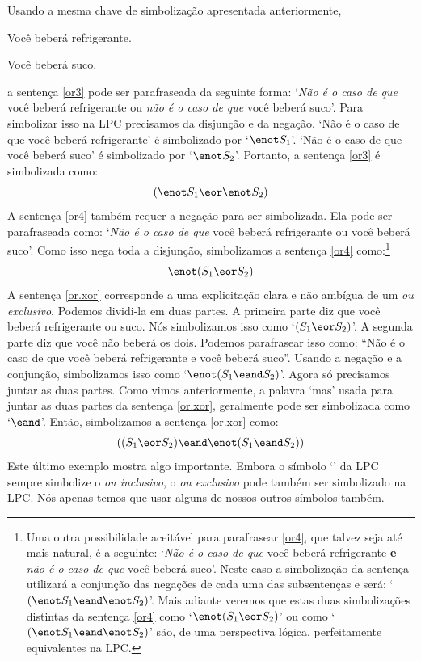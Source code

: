 Usando a mesma chave de simbolização apresentada anteriormente,
	\begin{ekey}
		\item[S_1] Você beberá refrigerante.
		\item[S_2] Você beberá suco.
	\end{ekey}
a sentença \ref{or3} pode ser parafraseada da seguinte forma:
`\emph{Não é o caso de que} você beberá refrigerante ou \emph{não é o caso de que} você beberá suco'.
Para simbolizar isso na LPC precisamos da disjunção e da negação.
`Não é o caso de que você beberá refrigerante' é simbolizado por `$\enot S_1$'. `Não é o caso de que você beberá suco' é simbolizado por `$\enot S_2$'. Portanto, a sentença \ref{or3} é simbolizada como:
$$(\enot S_1 \eor \enot S_2)$$
A sentença \ref{or4} também requer a negação para ser simbolizada.
Ela pode ser parafraseada como:
`\emph{Não é o caso de que} você beberá refrigerante ou você beberá suco'.
Como isso nega toda a disjunção, simbolizamos a sentença \ref{or4} como:\footnote{
	Uma outra possibilidade aceitável para parafrasear \ref{or4}, que talvez seja até mais natural, é a seguinte:
	`\emph{Não é o caso de que} você beberá refrigerante \textbf{e} \emph{não é o caso de que} você beberá suco'. Neste caso a simbolização da sentença utilizará a conjunção das negações de cada uma das subsentenças e será: `$(\enot S_1 \eand \enot S_2)$'.
	Mais adiante veremos que estas duas simbolizações distintas da sentença \ref{or4} como `$\enot(S_1 \eor S_2)$' ou como `$(\enot S_1 \eand \enot S_2)$' são, de uma perspectiva lógica, perfeitamente equivalentes na LPC.}
$$\enot(S_1 \eor S_2)$$
A sentença \ref{or.xor} corresponde a uma explicitação clara e não ambígua de um \emph{ou exclusivo}. 
Podemos dividi-la em duas partes.
A primeira parte diz que você beberá refrigerante ou suco.
Nós simbolizamos isso como `$(S_1 \eor S_2)$'.
A segunda parte diz que você não beberá os dois.
Podemos parafrasear isso como:
``Não é o caso de que você beberá refrigerante e você beberá suco''.
Usando a negação e a conjunção, simbolizamos isso como `$\enot(S_1 \eand S_2)$'.
Agora só precisamos juntar as duas partes.
Como vimos anteriormente, a palavra `mas' usada para juntar as duas partes da sentença \ref{or.xor}, geralmente pode ser simbolizada como `$\eand$'.
Então, simbolizamos a sentença \ref{or.xor} como:
$$((S_1 \eor S_2) \eand \enot (S_1 \eand S_2))$$
Este último exemplo mostra algo importante.
Embora o símbolo `\eor' da LPC sempre simbolize o \emph{ou inclusivo}, o \emph{ou exclusivo} pode também ser simbolizado na LPC.
Nós apenas temos que usar alguns de nossos outros símbolos também.




